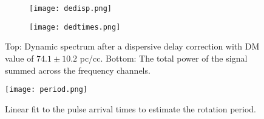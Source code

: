 \documentclass[12pt]{article}
\begin{document}
\begin{figure}
\centering
  \begin{subfigure}[h]{1\textwidth}
  	\centering
    \texttt{[image: dedisp.png]}
  \end{subfigure}
  \begin{subfigure}[h]{1\textwidth}
  	\centering
    \texttt{[image: dedtimes.png]}
  \end{subfigure}
  \caption{Top: Dynamic spectrum after a dispersive delay correction with $\mbox{DM} $ value of $ 74.1 \pm 10.2$ pc/cc. Bottom: The total power of the signal summed across the frequency channels.} 
\end{figure}

\newpage
\begin{figure}
\centering
\texttt{[image: period.png]}
\caption{Linear fit to the pulse arrival times to estimate the rotation period.}
\end{figure}
\end{document}
